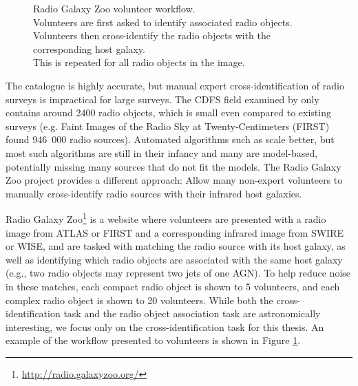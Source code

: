 \begin{figure}
\begin{subfigure}[t]{0.3\textwidth}
            \end{subfigure}
            \caption{Radio Galaxy Zoo volunteer workflow.\\
                \protect\makebox[1.5cm][r]{\ref{fig:rgz-interface-a}}
                    Volunteers are first asked to identify associated radio
                    objects.\\
                \protect\makebox[1.5cm][r]{\ref{fig:rgz-interface-b}}
                    Volunteers then cross-identify the radio objects with the
                    corresponding host galaxy.\\
                \protect\makebox[1.5cm][r]{\ref{fig:rgz-interface-c}}
                    This is repeated for all radio objects in the image.}
            \label{fig:rgz-interface}
        \end{figure}

    The \citeauthor{norris06} catalogue is highly accurate, but manual expert
    cross-identification of radio surveys is impractical for large surveys. The
    CDFS field examined by \citeauthor{norris06} only contains around 2400 radio
    objects, which is small even compared to existing surveys (e.g. Faint Images
    of the Radio Sky at Twenty-Centimeters (FIRST) \citep{becker95} found
    946~000 radio sources). Automated algorithms such as \citeauthor{fan15}
    scale better, but most such algorithms are still in their infancy
    \citeauthor{norris16} and many are model-based, potentially missing many
    sources that do not fit the models. The Radio Galaxy Zoo project
    \citep{banfield15} provides a different approach: Allow many non-expert
    volunteers to manually cross-identify radio sources with their infrared host
    galaxies.

    Radio Galaxy Zoo\footnote{\url{http://radio.galaxyzoo.org/}} is a website
    where volunteers are presented with a radio image from ATLAS or FIRST and a
    corresponding infrared image from SWIRE or WISE, and are tasked with
    matching the radio source with its host galaxy, as well as identifying which
    radio objects are associated with the same host galaxy (e.g., two radio
    objects may represent two jets of one AGN). To help reduce noise in these
    matches, each compact radio object is shown to 5 volunteers, and each
    complex radio object is shown to 20 volunteers. While both the
    cross-identification task and the radio object association task are
    astronomically interesting, we focus only on the cross-identification task
    for this thesis. An example of the workflow presented to volunteers is shown
    in Figure \ref{fig:rgz-interface}.

